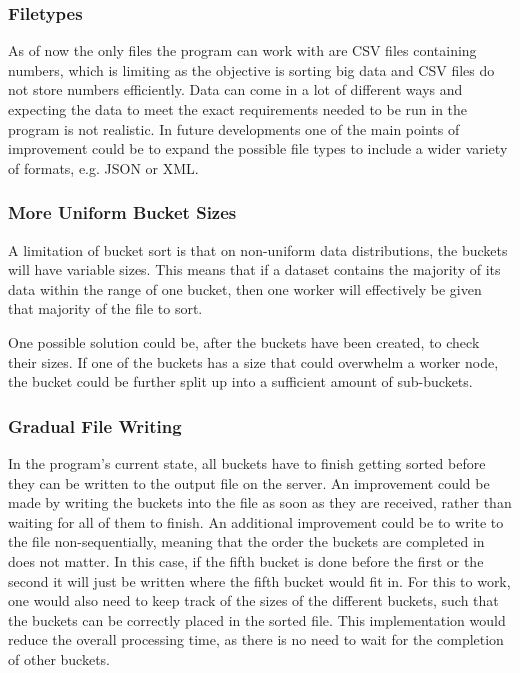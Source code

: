 \subsubsection{Filetypes}
As of now the only files the program can work with are CSV files containing numbers, which is limiting as the objective is sorting big data and CSV files do not store numbers efficiently. Data can come in a lot of different ways and expecting the data to meet the exact requirements needed to be run in the program is not realistic. In future developments one of the main points of improvement could be to expand the possible file types to include a wider variety of formats, e.g. JSON or XML. 

\subsubsection{More Uniform Bucket Sizes} \label{sec:betterBuckets}
A limitation of bucket sort is that on non-uniform data distributions, the buckets will have variable sizes. This means that if a dataset contains the majority of its data within the range of one bucket, then one worker will effectively be given that majority of the file to sort. 

One possible solution could be, after the buckets have been created, to check their sizes. If one of the buckets has a size that could overwhelm a worker node, the bucket could be further split up into a sufficient amount of sub-buckets. 

\subsubsection{Gradual File Writing}
In the program's current state, all buckets have to finish getting sorted before they can be written to the output file on the server. An improvement could be made by writing the buckets into the file as soon as they are received, rather than waiting for all of them to finish. An additional improvement could be to write to the file non-sequentially, meaning that the order the buckets are completed in does not matter. In this case, if the fifth bucket is done before the first or the second it will just be written where the fifth bucket would fit in. For this to work, one would also need to keep track of the sizes of the different buckets, such that the buckets can be correctly placed in the sorted file. This implementation would reduce the overall processing time, as there is no need to wait for the completion of other buckets. 

